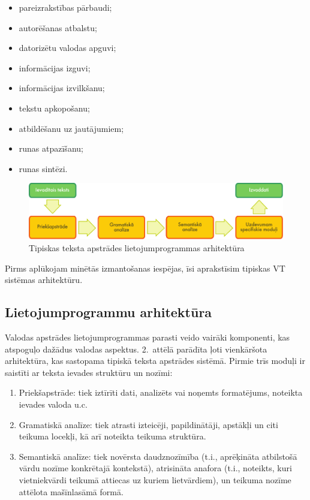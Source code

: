 \begin{multicols}{2}
\begin{itemize}
\item  pareizrakstības pārbaudi;
\item  autorēšanas atbalstu;
\item  datorizētu valodas apguvi;
\item  informācijas izguvi; 
\item  informācijas izvilkšanu;
\item  tekstu apkopošanu;
\item  atbildēšanu uz jautājumiem;
\item  runas atpazīšanu; 
\item  runas sintēzi. 
\end{itemize}

\begin{figure}[htb]
  \center
  \includegraphics[width=\textwidth]{../_media/latvian/text_processing_app_architecture}
  \caption{Tipiskas teksta apstrādes lietojumprogrammas arhitektūra}
  \label{fig:textprocessingarch_de}
\end{figure}

Pirms aplūkojam minētās izmantošanas iespējas, īsi aprakstīsim tipiskas VT sistēmas arhitektūru.

\subsection{Lietojumprogrammu arhitektūra}

Valodas apstrādes lietojumprogrammas parasti veido vairāki komponenti, kas atspoguļo dažādus valodas aspektus.
2.~attēlā parādīta ļoti vienkāršota arhitektūra, kas sastopama tipiskā teksta apstrādes sistēmā.
Pirmie trīs moduļi ir saistīti ar teksta ievades struktūru un nozīmi:

\begin{enumerate}
\item  Priekšapstrāde: tiek iztīrīti dati, analizēts vai noņemts formatējums, noteikta ievades valoda u.c.
\item  Gramatiskā analīze: tiek atrasti izteicēji, papildinātāji, apstākļi un citi teikuma locekļi, kā arī noteikta teikuma struktūra.
\item  Semantiskā analīze: tiek novērsta daudznozīmība (t.i., aprēķināta atbilstošā vārdu nozīme konkrētajā kontekstā), atrisināta anafora (t.i., noteikts, kuri vietniekvārdi teikumā attiecas uz kuriem lietvārdiem), un teikuma nozīme attēlota mašīnlasāmā formā.
\end{enumerate}


\end{multicols}
